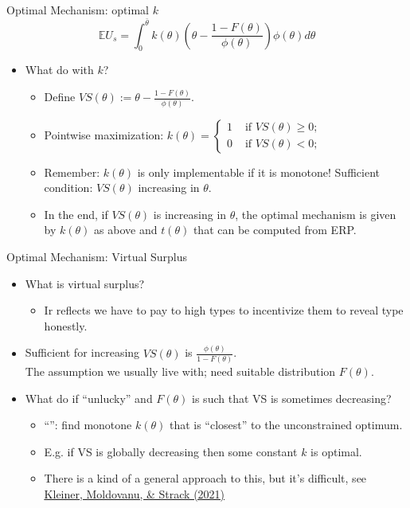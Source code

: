 \documentclass[english,10pt
,aspectratio=169
]{beamer}
\begin{document}
\begin{frame}{Optimal Mechanism: optimal $k$}
\begin{equation*}
	\mathbb{E} U_s = \int_0^{\bar{\theta}} k(\theta) \left( \theta - \frac{1-F(\theta)}{\phi(\theta)} \right) \phi(\theta) d\theta
\end{equation*}
\begin{itemize}
	\item What do with $k$?
	\begin{itemize}[<+->]
		\item Define  $VS(\theta) := \theta - \frac{1-F(\theta)}{\phi(\theta)}$.
		\item Pointwise maximization: 
		$k(\theta) = \begin{cases}
			1 & \text{ if } VS(\theta) \geq 0;
			\\ 0 & \text{ if } VS(\theta) < 0;
		\end{cases}$
		\item Remember: $k(\theta)$ is only implementable if it is monotone! Sufficient condition: $VS(\theta)$ increasing in $\theta$.
		\item In the end, if $VS(\theta)$ is increasing in $\theta$, the optimal mechanism is given by $k(\theta)$ as above and $t(\theta)$ that can be computed from ERP.
	\end{itemize}
\end{itemize}
\end{frame}


\begin{frame}{Optimal Mechanism: Virtual Surplus}
\begin{itemize}
	\item What is virtual surplus?
	\begin{itemize}
		\item Ir reflects  we have to pay to high types to incentivize them to reveal type honestly.
	\end{itemize}
	\item Sufficient for increasing $VS(\theta)$ is  $\frac{\phi(\theta)}{1-F(\theta)}$. \\ 
	The assumption we usually live with; need suitable distribution $F(\theta)$.
	\item What do if ``unlucky'' and $F(\theta)$ is such that VS is sometimes decreasing?
	\begin{itemize}
		\item ``'': find monotone $k(\theta)$ that is ``closest'' to the unconstrained optimum.
		\item E.g. if VS is globally decreasing then some constant $k$ is optimal.
		\item There is a kind of a general approach to this, but it's difficult, see \href{https://onlinelibrary.wiley.com/doi/abs/10.3982/ECTA18312}{\uline{Kleiner, Moldovanu, \& Strack (2021)}}
	\end{itemize}
\end{itemize}
\end{frame}
\end{document}
